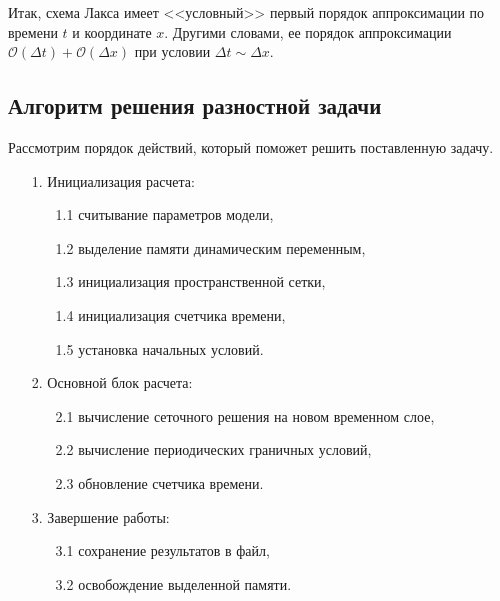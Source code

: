 \documentclass[12pt,a4paper]{article}
\begin{document}
	Итак, схема Лакса имеет <<условный>> первый порядок аппроксимации по времени $t$ и координате $x$. Другими словами, ее порядок аппроксимации $\mathcal{O}(\Delta t)+\mathcal{O}(\Delta x)$ при условии $\Delta t \sim \Delta x$.
	
	\subsection{Алгоритм решения разностной задачи}
	Рассмотрим порядок действий, который поможет решить поставленную задачу.
	\begin{itemize}
		\item [1.] Инициализация расчета:
		\begin{itemize}
			\item [1.1] считывание параметров модели,
			\item [1.2] выделение памяти динамическим переменным,
			\item [1.3] инициализация пространственной сетки,
			\item [1.4] инициализация счетчика времени,
			\item [1.5] установка начальных условий.
		\end{itemize}
		\item [2.] Основной блок расчета:
		\begin{itemize}
			\item [2.1] вычисление сеточного решения на новом временном слое,
			\item [2.2] вычисление периодических граничных условий,
			\item [2.3] обновление счетчика времени.
		\end{itemize}
		\item [3.] Завершение работы:
		\begin{itemize}
			\item [3.1] сохранение результатов в файл,
			\item [3.2] освобождение выделенной памяти.
		\end{itemize}
	\end{itemize}
	
\end{document}

